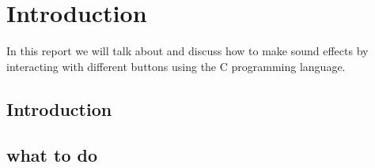 \chapter{Introduction}
In this report we will talk about and discuss how to make sound effects by interacting with different buttons using the C programming language.   
\section{Introduction}
\section{what to do}